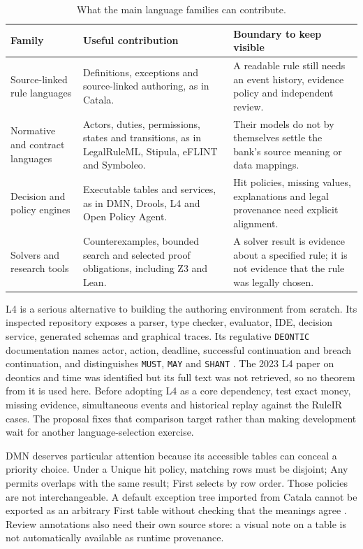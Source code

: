 \begin{table}[htbp]
\centering
\caption{What the main language families can contribute.}
\label{tab:software}
\begin{tabularx}{\textwidth}{P{35mm}P{52mm}Y}
\toprule
Family & Useful contribution & Boundary to keep visible\\
\midrule
Source-linked rule languages & Definitions, exceptions and source-linked authoring, as in Catala. & A readable rule still needs an event history, evidence policy and independent review.\\
Normative and contract languages & Actors, duties, permissions, states and transitions, as in LegalRuleML, Stipula, eFLINT and Symboleo. & Their models do not by themselves settle the bank's source meaning or data mappings.\\
Decision and policy engines & Executable tables and services, as in DMN, Drools, L4 and Open Policy Agent. & Hit policies, missing values, explanations and legal provenance need explicit alignment.\\
Solvers and research tools & Counterexamples, bounded search and selected proof obligations, including Z3 and Lean. & A solver result is evidence about a specified rule; it is not evidence that the rule was legally chosen.\\
\bottomrule
\end{tabularx}
\end{table}


L4 is a serious alternative to building the authoring environment from scratch.
Its inspected repository exposes a parser, type checker, evaluator, IDE,
decision service, generated schemas and graphical traces. Its regulative
\texttt{DEONTIC} documentation names actor, action, deadline, successful
continuation and breach continuation, and distinguishes \texttt{MUST},
\texttt{MAY} and \texttt{SHANT} \citep{l4code}. The 2023 L4 paper on deontics
and time was identified but its full text was not retrieved, so no theorem from
it is used here. Before adopting L4 as a core dependency, test exact money,
missing evidence, simultaneous events and historical replay against the RuleIR
cases. The proposal fixes that comparison target rather than making development
wait for another language-selection exercise.

DMN deserves particular attention because its accessible tables can conceal a
priority choice. Under a Unique hit policy, matching rows must be disjoint; Any
permits overlaps with the same result; First selects by row order. Those policies
are not interchangeable. A default exception tree imported from Catala cannot be
exported as an arbitrary First table without checking that the meanings agree
\citep[sec.~8.2.11]{dmn2024}. Review annotations also need their own source store:
a visual note on a table is not automatically available as runtime provenance.

